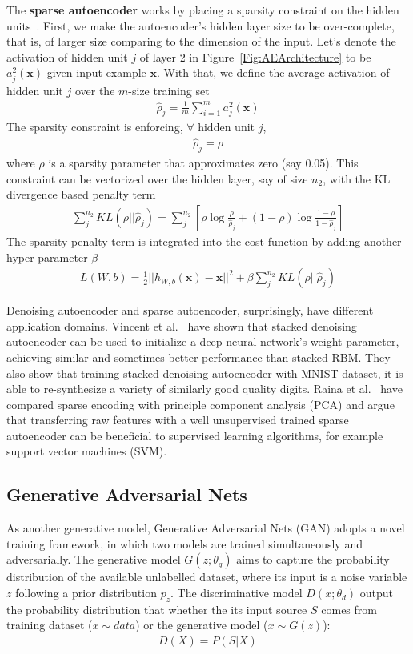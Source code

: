 The \textbf{sparse autoencoder} works by placing a sparsity constraint on the hidden units~\cite{SparseAE}.
First, we make the autoencoder's hidden layer size to be over-complete,
that is, of larger size comparing to the dimension of the input.
Let's denote the activation of hidden unit $j$ of layer 2 in Figure~\ref{Fig:AEArchitecture}
to be $a^2_j(\mathbf{x})$ given input example $\mathbf{x}$.
With that, we define the average activation of hidden unit $j$ over the $m$-size
training set
\begin{align}
    \hat{\rho}_j = \frac{1}{m} \sum_{i=1}^{m} a^2_j(\mathbf{x})
\end{align}
The sparsity constraint is enforcing, $\forall$ hidden unit $j$,
\begin{align}
    \hat{\rho}_j = \rho
\end{align}
where $\rho$ is a sparsity parameter that approximates zero (say 0.05).
This constraint can be vectorized over the hidden layer, say of size $n_2$,
with the KL divergence based penalty term
\begin{align}
    \sum_j^{n_2} KL(\rho || \hat{\rho}_j)
    = \sum_j^{n_2} [\rho \log \frac{\rho}{\hat{\rho}_j} + (1 - \rho) \log \frac{1-\rho}{1-\hat{\rho}_j} ]
\end{align}
The sparsity penalty term is integrated into the cost function by adding another hyper-parameter $\beta$
\begin{align}
    L(W, b) = \frac{1}{2}||h_{W,b}(\mathbf{x}) - \mathbf{x}||^2 +
    \beta \sum_j^{n_2} KL(\rho || \hat{\rho}_j)
\end{align}

Denoising autoencoder and sparse autoencoder, surprisingly, have different application domains.
Vincent et al.~\cite{DenoiseAE} have shown that stacked denoising autoencoder can be used to
initialize a deep neural network's weight parameter,
achieving similar and sometimes better performance than stacked RBM.
They also show that training stacked denoising autoencoder with MNIST dataset, it is able
to re-synthesize a variety of similarly good quality digits.
Raina et al.~\cite{SparseAE} have compared sparse encoding with principle component analysis
(PCA) and argue that transferring raw features with a well unsupervised trained
sparse autoencoder can be beneficial to supervised learning algorithms,
for example support vector machines (SVM).


\subsection{Generative Adversarial Nets}
As another generative model, Generative Adversarial Nets (GAN)\cite{GAN} adopts a novel training framework,
in which two models are trained simultaneously and adversarially.
The generative model $G(z;\theta_g)$ aims to capture the probability distribution of the available unlabelled dataset,
where its input is a noise variable $z$ following a prior distribution $p_z$.
The discriminative model $D(x;\theta_d)$ output the probability distribution that whether the its input source $S$ comes
from training dataset ($x\sim data$) or the generative model ($x \sim G(z)$):
\begin{align}
    D(X) = P(S|X)
\end{align}

